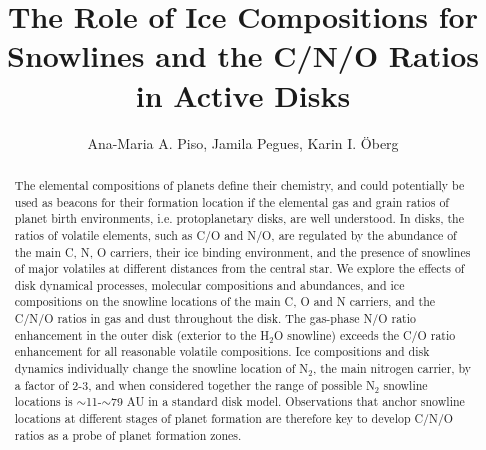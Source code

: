 \documentclass[apj]{emulateapj}
\begin{document}


\title{The Role of Ice Compositions for Snowlines and the C/N/O Ratios in Active Disks}

\author{Ana-Maria A. Piso, Jamila Pegues, Karin I. \"Oberg}



\begin{abstract}
The elemental compositions of planets define their chemistry, and could potentially be used as beacons for their formation location if the elemental gas and grain ratios of planet birth environments, i.e. protoplanetary disks, are well understood. In disks, the ratios of volatile elements, such as C/O and N/O, are regulated by the abundance of the main C, N, O carriers, their ice binding environment, and the presence of snowlines of major volatiles at different distances from the central star. We explore the effects of disk dynamical processes, molecular compositions and abundances, and ice compositions on the snowline locations of the main C, O and N carriers, and the C/N/O ratios in gas and dust throughout the disk. The gas-phase N/O ratio enhancement in the outer disk (exterior to the H$_2$O snowline) exceeds the C/O ratio enhancement for all reasonable volatile compositions. Ice compositions and disk dynamics individually change the snowline location of N$_2$, the main nitrogen carrier, by a factor of 2-3, and when considered together the range of possible N$_2$ snowline locations is $\sim$11-$\sim$79 AU in a standard disk model. Observations that anchor snowline locations at different stages of planet formation are therefore key to develop C/N/O ratios as a probe of planet formation zones. 


\end{abstract}
\end{document}
